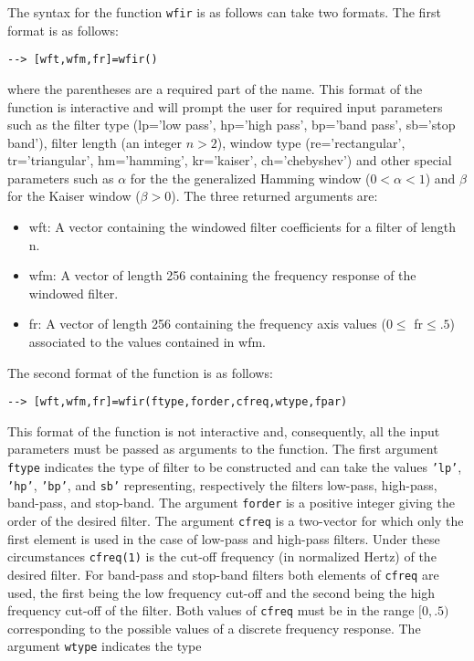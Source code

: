	The syntax for the function {\tt wfir} is as follows can take 
two formats.  The first format is as follows:
\begin{verbatim}
--> [wft,wfm,fr]=wfir()
\end{verbatim}
where the parentheses are a required part of the name.  
This format of the function is interactive and will prompt the user for 
required input parameters such as the filter type (lp='low pass',
hp='high pass', bp='band pass', sb='stop band'),
filter length (an integer $n>2$), window type (re='rectangular',
tr='triangular', hm='hamming', kr='kaiser', ch='chebyshev')
and other special parameters such as $\alpha$ for the
the generalized Hamming window ($0<\alpha<1$) and $\beta$
for the Kaiser window ($\beta>0$).
The three returned arguments are:
%
\begin{itemize}
\item{wft:}
  A vector containing the windowed filter coefficients for a filter of length n.
\item{wfm:}
  A vector of length 256 containing the frequency response of the windowed 
  filter.
\item{fr:}
  A vector of length 256  containing the frequency axis values 
  ($0\le$ fr$\le .5$) associated to the values contained in wfm.
\end{itemize}
%
The second format of the function is as follows:
\begin{verbatim}
--> [wft,wfm,fr]=wfir(ftype,forder,cfreq,wtype,fpar)
\end{verbatim}
This format of the function is not interactive and, consequently, all
the input parameters must be passed as arguments to the function.  
The first argument {\tt ftype} indicates the type of filter to
be constructed and can take the values {\tt 'lp'}, {\tt 'hp'},
{\tt 'bp'}, and {\tt sb'} representing, respectively the filters
low-pass, high-pass, band-pass, and stop-band.  
The argument {\tt forder} is a positive
integer giving the order of the desired filter.  The argument
{\tt cfreq} is a two-vector for which only the first element is
used in the case of low-pass and high-pass filters.  Under these
circumstances {\tt cfreq(1)} is the cut-off frequency (in normalized
Hertz) of the desired filter. For band-pass and stop-band filters
both elements of {\tt cfreq} are used, the first being the low
frequency cut-off and the second being the high frequency cut-off
of the filter.  Both values of {\tt cfreq} must be in the range
$[0,.5)$ corresponding to the possible values of a discrete
frequency response.  The argument {\tt wtype} indicates the type
